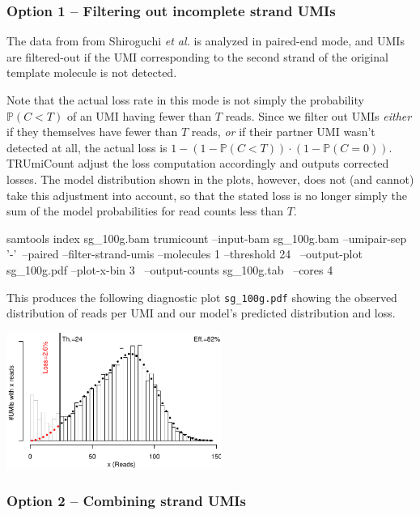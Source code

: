 \documentclass[10pt]{article}
\begin{document}
\subsubsection*{Option 1 -- Filtering out incomplete strand UMIs}

The data from from Shiroguchi \textit{et al.} is analyzed in paired-end mode, and UMIs are filtered-out if the UMI corresponding to the second strand of the original template molecule is not detected.

Note that the actual loss rate in this mode is not simply the probability $\mathbb{P}(C < T)$ of an UMI having fewer than $T$ reads. Since we filter out UMIs \emph{either} if they themselves have fewer than $T$ reads, \emph{or} if their partner UMI wasn't detected at all, the actual loss is $1 - (1 - \mathbb{P}(C < T))\cdot (1 - \mathbb{P}(C=0))$. TRUmiCount adjust the loss computation accordingly and outputs corrected losses. The model distribution shown in the plots, however,  does not (and cannot) take this adjustment into account, so that the stated loss is no longer simply the sum of the model probabilities for read counts less than $T$.

\begin{shellcode}
samtools index sg_100g.bam
trumicount --input-bam sg_100g.bam --umipair-sep '-'\
  --paired --filter-strand-umis --molecules 1 --threshold 24 \
  --output-plot sg_100g.pdf --plot-x-bin 3 \
  --output-counts sg_100g.tab \
  --cores 4
\end{shellcode}

This produces the following diagnostic plot \texttt{sg\_100g.pdf} showing the observed distribution of reads per UMI and our model's predicted distribution and loss.

{\centering \includegraphics[width=7cm]{../examples/sg_100g.pdf}\\}

\subsubsection*{Option 2 -- Combining strand UMIs}
\end{document}
